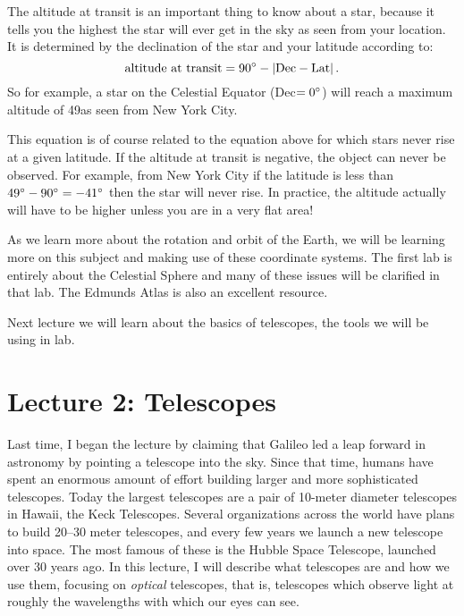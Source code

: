 \documentclass[12pt, preprint]{aastex}
\begin{document}
The altitude at transit is an important thing to know about a star,
because it tells you the highest the star will ever get in the sky
as seen from your location. It is determined by the declination of the
star and your latitude according to:
\begin{equation}
\label{eq:maxalt}
\mathrm{altitude~at~transit} = 90{}^\circ - \left|\mathrm{Dec} -
\mathrm{Lat}\right|.
\end{equation}
So for example, a star on the Celestial Equator (Dec$=0{}^\circ$) will
reach a maximum altitude of 49\degree as seen from New York City.

This equation is of course related to the equation above for which
stars never rise at a given latitude. If the altitude at transit is
negative, the object can never be observed. For example, from New York
City if the latitude is less than $49{}^\circ-90{}^\circ = - 41{}^\circ$
then the star will never rise. In practice, the altitude actually will
have to be higher unless you are in a very flat area!

As we learn more about the rotation and orbit of the Earth, we will be
learning more on this subject and making use of these coordinate
systems. The first lab is entirely about the Celestial Sphere and many
of these issues will be clarified in that lab. The Edmunds Atlas is
also an excellent resource.

Next lecture we will learn about the basics of telescopes, the tools
we will be using in lab.

\clearpage

\section{Lecture 2: Telescopes}

Last time, I began the lecture by claiming that Galileo led a leap
forward in astronomy by pointing a telescope into the sky. Since that
time, humans have spent an enormous amount of effort building larger
and more sophisticated telescopes. Today the largest telescopes are a
pair of 10-meter diameter telescopes in Hawaii, the Keck
Telescopes. Several organizations across the world have plans to build
20--30 meter telescopes, and every few years we launch a new telescope
into space. The most famous of these is the Hubble Space Telescope,
launched over 30 years ago. In this lecture, I will describe what
telescopes are and how we use them, focusing on {\it optical}
telescopes, that is, telescopes which observe light at roughly the
wavelengths with which our eyes can see.
\end{document}
